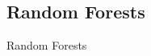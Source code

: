 \documentclass[xcolor=pdftex,dvipsnames,table]{beamer}
\begin{document}



\subsection{Random Forests}
\begin{frame}[plain,c]
\begin{center}
\Huge Random Forests
\end{center}
\end{frame}
\end{document}
